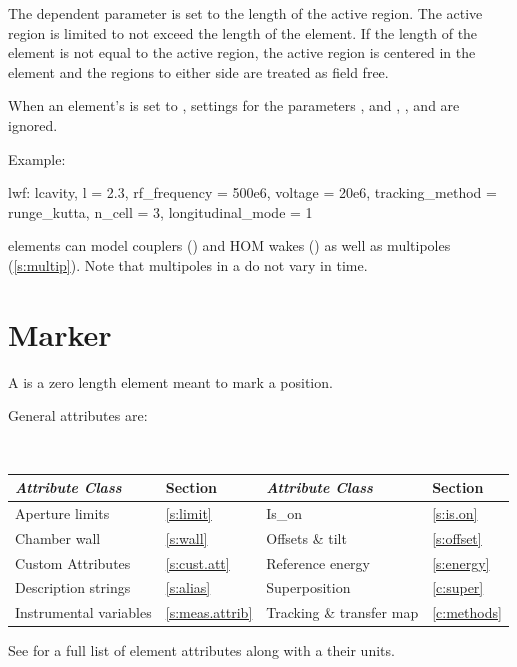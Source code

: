 {The dependent parameter  is set to the length of
the active region. The active region is limited to not exceed the length of the element. If
the length of the element is not equal to the active region, the active region is centered in the
element and the regions to either side are treated as field free.

When an element's  is set to , settings for the
parameters , and , , and  are ignored.

Example:
\begin{example}
  lwf: lcavity, l = 2.3, rf_frequency = 500e6, voltage = 20e6,
         tracking_method = runge_kutta, n_cell = 3, longitudinal_mode = 1
\end{example}

 elements can model couplers () and HOM wakes () as well as
multipoles (\ref{s:multip}). Note that multipoles in a  do not vary in time.

\newpage

\section{Marker}
\label{s:mark}

A  is a zero length element meant to mark a position. 

General  attributes are:
\begin{center} 
\tt
\begin{tabular}{llll} \toprule
  {\sl Attribute Class}      & Section             & {\sl Attribute Class}        & Section         \\ \midrule
  Aperture limits            & \ref{s:limit}       & Is_on                        & \ref{s:is.on}   \\ 
  Chamber wall               & \ref{s:wall}        & Offsets \& tilt              & \ref{s:offset}  \\
  Custom Attributes          & \ref{s:cust.att}    & Reference energy             & \ref{s:energy}  \\
  Description strings        & \ref{s:alias}       & Superposition                & \ref{c:super}   \\
  Instrumental variables     & \ref{s:meas.attrib} & Tracking \& transfer map     & \ref{c:methods} \\ 
  \bottomrule
\end{tabular}
\end{center}
\toffset
See  for a full list of element attributes along with a their units.

}

